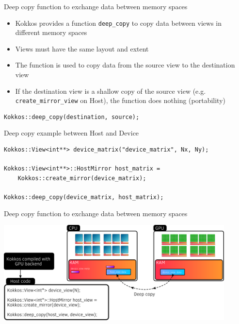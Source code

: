 \documentclass[aspectratio=169]{beamer}
\begin{document}

\begin{frame}[fragile]{Deep copy function to exchange data between memory spaces}
    \begin{itemize}
        \item Kokkos provides a function \texttt{deep\_copy} to copy data between views in different memory spaces
        \item Views must have the same layout and extent
        \item The function is used to copy data from the source view to the destination view
        \item If the destination view is a shallow copy of the source view (e.g. \texttt{create\_mirror\_view} on Host), the function does nothing (portability)
    \end{itemize}
    \begin{verbatim}
Kokkos::deep_copy(destination, source);
    \end{verbatim}
\end{frame}


\begin{frame}[fragile]{Deep copy example between Host and Device}
    \begin{verbatim}
Kokkos::View<int**> device_matrix("device_matrix", Nx, Ny);

Kokkos::View<int**>::HostMirror host_matrix =
    Kokkos::create_mirror(device_matrix);

Kokkos::deep_copy(device_matrix, host_matrix);
    \end{verbatim}
\end{frame}


\begin{frame}{Deep copy function to exchange data between memory spaces}
    \begin{center}
        \includegraphics[width=0.9\textwidth]{device_host_deep_copy.png}
    \end{center}
\end{frame}
\end{document}
